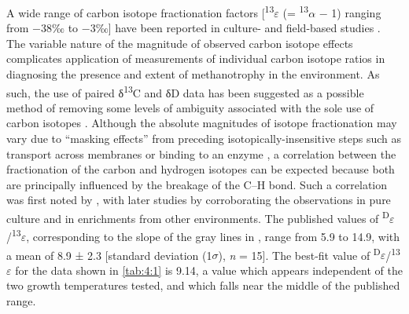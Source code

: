 A wide range of carbon isotope fractionation factors
{[}\textsuperscript{13}$\varepsilon$ (= \textsuperscript{13}$\alpha$ $-$ 1) ranging from $-$38‰
to $-$3‰{]} have been reported in culture- and field-based studies \parencite[see][and references therein]{Templeton++_2006_GCA}. The variable nature
of the magnitude of observed carbon isotope effects complicates
application of measurements of individual carbon isotope ratios in
diagnosing the presence and extent of methanotrophy in the environment.
As such, the use of paired δ\textsuperscript{13}C and δD data has been
suggested as a possible method of removing some levels of ambiguity
associated with the sole use of carbon isotopes \parencite{Elsner++_2005_EST}.
Although the absolute magnitudes of isotope fractionation may vary due
to ``masking effects'' from preceding isotopically-insensitive steps
such as transport across membranes or binding to an enzyme \parencite{Feisthauer++_2011_GCA}, a correlation between the fractionation of the carbon and
hydrogen isotopes can be expected because both are principally
influenced by the breakage of the C--H bond. Such a correlation was
first noted by \textcite{Coleman++_1981_GCA}, with later studies by \textcite{Kinnaman++_2007_GCA,Powelson++_2007_EST,Feisthauer++_2011_GCA} corroborating
the observations in pure culture and in enrichments from other
environments. The published values of
\textsuperscript{D}$\varepsilon$/\textsuperscript{13}$\varepsilon$, corresponding to the slope
of the gray lines in , range from 5.9 to 14.9, with a mean of 8.9
± 2.3 {[}standard deviation (1$\sigma$), \emph{n} = 15{]}. The best-fit value
of \textsuperscript{D}$\varepsilon$/\textsuperscript{13}$\varepsilon$ for the data shown in
\autoref{tab:4:1} is 9.14, a value which appears independent of the two growth
temperatures tested, and which falls near the middle of the published
range.




